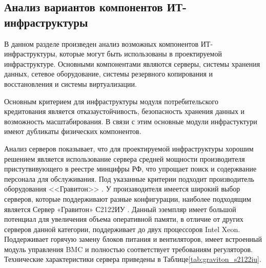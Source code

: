 \documentclass[14pt, a4paper]{extarticle}
\begin{document}
\subsection{Анализ вариантов компонентов ИТ-инфраструктуры}

В данном разделе произведен анализ возможных компонентов ИТ-инфраструктуры,
которые могут быть использованы в проектируемой инфраструктуре. Основными
компонентами являются серверы, системы хранения данных, сетевое оборудование,
системы резервного копирования и восстановления и системы виртуализации.

Основным критерием для инфраструктуры модуля потребительского кредитования
является отказаустойчивость, безопасность хранения данных и возможность
масштабирования. В связи с этим основные модули инфрастуктури имеют дубликаты
физических компонентов.

Анализ серверов показывает, что для проектируемой инфраструктуры хорошим решением
является использование сервера средней мощности производителя пристутвивующего
в реестре минцифры РФ, что упрощает поиск и содержвание персонала для
обслуживания. Под указанные критерии подходит производитель оборудования <<Гравитон>> \cite{graviton-site}.
У произаводителя имеется широкий выбор серверов, которые поддерживают
разные конфигурации, наиболее подходящим является Сервер «Гравитон» С2122ИУ \cite{graiton-server-s2122iu}.
Данный эземпляр имеет большой потенциал для увеличения объема оперативной памяти,
в отличие от других серверов данной категории, поддерживает до двух процессоров Intel
Xeon. Поддерживает горячую замену блоков питания и вентиляторов, имеет встроенный
модуль управления BMC и полностью соответствует требованиям регуляторов.
Технические характеристики сервера приведены в Таблице\;\ref{tab:graviton_s2122iu}.
\end{document}
